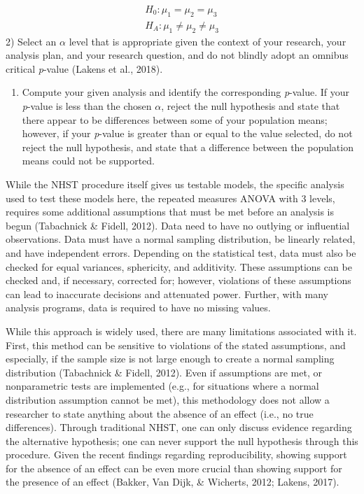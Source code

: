 \documentclass[english,man]{apa6}
\providecommand{\tightlist}{%
  \setlength{\itemsep}{0pt}\setlength{\parskip}{0pt}}
\theoremstyle{definition}
\theoremstyle{definition}
\theoremstyle{definition}
\theoremstyle{remark}
\begin{document}
\[
\begin{aligned}
  H_0: \mu_1 = \mu_2 = \mu_3 \\
  H_A: \mu_1 \neq \mu_2 \neq \mu_3
\end{aligned}
\] 2) Select an \(\alpha\) level that is appropriate given the context
of your research, your analysis plan, and your research question, and do
not blindly adopt an omnibus critical \emph{p}-value (Lakens et al.,
2018).

\begin{enumerate}
\def\labelenumi{\arabic{enumi})}
\setcounter{enumi}{2}
\tightlist
\item
  Compute your given analysis and identify the corresponding
  \emph{p}-value. If your \emph{p}-value is less than the chosen
  \(\alpha\), reject the null hypothesis and state that there appear to
  be differences between some of your population means; however, if your
  \emph{p}-value is greater than or equal to the value selected, do not
  reject the null hypothesis, and state that a difference between the
  population means could not be supported.
\end{enumerate}

While the NHST procedure itself gives us testable models, the specific
analysis used to test these models here, the repeated measures ANOVA
with 3 levels, requires some additional assumptions that must be met
before an analysis is begun (Tabachnick \& Fidell, 2012). Data need to
have no outlying or influential observations. Data must have a normal
sampling distribution, be linearly related, and have independent errors.
Depending on the statistical test, data must also be checked for equal
variances, sphericity, and additivity. These assumptions can be checked
and, if necessary, corrected for; however, violations of these
assumptions can lead to inaccurate decisions and attenuated power.
Further, with many analysis programs, data is required to have no
missing values.

While this approach is widely used, there are many limitations
associated with it. First, this method can be sensitive to violations of
the stated assumptions, and especially, if the sample size is not large
enough to create a normal sampling distribution (Tabachnick \& Fidell,
2012). Even if assumptions are met, or nonparametric tests are
implemented (e.g., for situations where a normal distribution assumption
cannot be met), this methodology does not allow a researcher to state
anything about the absence of an effect (i.e., no true differences).
Through traditional NHST, one can only discuss evidence regarding the
alternative hypothesis; one can never support the null hypothesis
through this procedure. Given the recent findings regarding
reproducibility, showing support for the absence of an effect can be
even more crucial than showing support for the presence of an effect
(Bakker, Van Dijk, \& Wicherts, 2012; Lakens, 2017).
\end{document}

